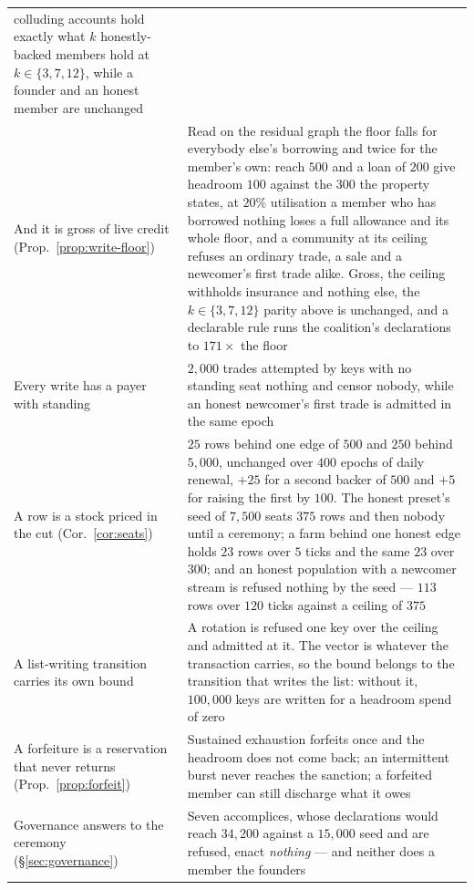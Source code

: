\begin{longtable}{@{}p{}p{}@{}}
    colluding accounts hold exactly what $k$ honestly-backed members hold at
    $k \in \{3,7,12\}$, while a founder and an honest member are unchanged \\
And it is gross of live credit (Prop.~\ref{prop:write-floor})
  & Read on the residual graph the floor falls for everybody else's borrowing and twice
    for the member's own: reach $500$ and a loan of $200$ give headroom $100$ against the
    $300$ the property states, at $20\%$ utilisation a member who has borrowed nothing
    loses a full allowance and its whole floor, and a community at its ceiling refuses an
    ordinary trade, a sale and a newcomer's first trade alike. Gross, the ceiling withholds
    insurance and nothing else, the $k \in \{3,7,12\}$ parity above is unchanged, and a
    declarable rule runs the coalition's declarations to $171\times$ the floor \\
Every write has a payer with standing
  & $2{,}000$ trades attempted by keys with no standing seat nothing and censor nobody,
    while an honest newcomer's first trade is admitted in the same epoch \\
A row is a stock priced in the cut (Cor.~\ref{cor:seats})
  & $25$ rows behind one edge of $500$ and $250$ behind $5{,}000$, unchanged over $400$
    epochs of daily renewal, $+25$ for a second backer of $500$ and $+5$ for raising the
    first by $100$. The honest preset's seed of $7{,}500$ seats $375$ rows and then nobody
    until a ceremony; a farm behind one honest edge holds $23$ rows over $5$ ticks and the
    same $23$ over $300$; and an honest population with a newcomer stream is refused
    nothing by the seed --- $113$ rows over $120$ ticks against a ceiling of $375$ \\
A list-writing transition carries its own bound
  & A rotation is refused one key over the ceiling and admitted at it. The vector is
    whatever the transaction carries, so the bound belongs to the transition that writes
    the list: without it, $100{,}000$ keys are written for a headroom spend of zero \\
A forfeiture is a reservation that never returns (Prop.~\ref{prop:forfeit})
  & Sustained exhaustion forfeits once and the headroom does not come back; an intermittent
    burst never reaches the sanction; a forfeited member can still discharge what it owes \\
Governance answers to the ceremony (\S\ref{sec:governance})
  & Seven accomplices, whose declarations would reach $34{,}200$ against a $15{,}000$ seed
    and are refused, enact \emph{nothing} --- and neither does a member the founders

\end{longtable}
